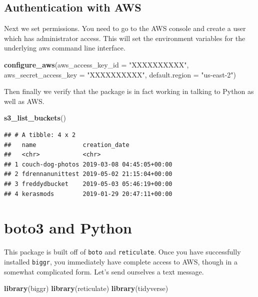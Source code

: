 \documentclass[]{book}
\newenvironment{Shaded}{\begin{snugshade}}{\end{snugshade}}
\newcommand{\DataTypeTok}[1]{\textcolor[rgb]{0.13,0.29,0.53}{#1}}
\newcommand{\KeywordTok}[1]{\textcolor[rgb]{0.13,0.29,0.53}{\textbf{#1}}}
\newcommand{\NormalTok}[1]{#1}
\newcommand{\StringTok}[1]{\textcolor[rgb]{0.31,0.60,0.02}{#1}}
\begin{document}
\hypertarget{authentication-with-aws}{%
\section{Authentication with AWS}\label{authentication-with-aws}}

Next we set permissions. You need to go to the AWS console and create a user which has administrator access. This will set the environment variables for the underlying aws command line interface.

\begin{Shaded}
\begin{Highlighting}[]
\KeywordTok{configure_aws}\NormalTok{(}\DataTypeTok{aws_access_key_id =} \StringTok{"XXXXXXXXXX"}\NormalTok{,}
              \DataTypeTok{aws_secret_access_key =} \StringTok{"XXXXXXXXXX"}\NormalTok{,}
              \DataTypeTok{default.region =} \StringTok{"us-east-2"}\NormalTok{)}
\end{Highlighting}
\end{Shaded}

Then finally we verify that the package is in fact working in talking to Python as well as AWS.

\begin{Shaded}
\begin{Highlighting}[]
\KeywordTok{s3_list_buckets}\NormalTok{()}
\end{Highlighting}
\end{Shaded}

\begin{verbatim}
## # A tibble: 4 x 2
##   name             creation_date            
##   <chr>            <chr>                    
## 1 couch-dog-photos 2019-03-08 04:45:05+00:00
## 2 fdrennanunittest 2019-05-02 21:15:04+00:00
## 3 freddydbucket    2019-05-03 05:46:19+00:00
## 4 kerasmods        2019-01-29 20:47:11+00:00
\end{verbatim}

\hypertarget{boto3-and-python}{%
\chapter{boto3 and Python}\label{boto3-and-python}}

This package is built off of \texttt{boto} and \texttt{reticulate}. Once you have successfully installed \texttt{biggr}, you immediately have complete access to AWS, though in a somewhat complicated form. Let's send ourselves a text message.

\begin{Shaded}
\begin{Highlighting}[]
\KeywordTok{library}\NormalTok{(biggr)}
\KeywordTok{library}\NormalTok{(reticulate)}
\KeywordTok{library}\NormalTok{(tidyverse)}
\end{Highlighting}
\end{Shaded}
\end{document}
